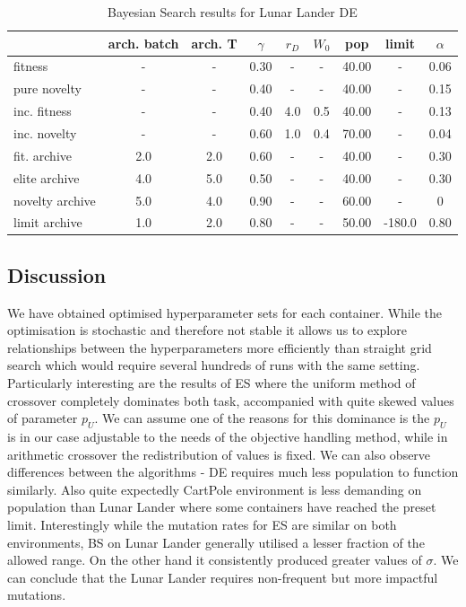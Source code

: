\begin{table}[ht]
	\centering
	\scriptsize
	\setlength{\tabcolsep}{4pt}
	\renewcommand{\arraystretch}{1.15}
	\begin{tabular}{lcccccccc}
		\toprule
		{} & arch. batch & arch. T &   $\gamma$ & $r_D$ & $W_0$ & pop &  limit &   $\alpha$ \\
		\midrule
		fitness         &           - &       - & 0.30 &     - &     - & 40.00 &      - & 0.06 \\
		pure novelty    &           - &       - & 0.40 &     - &     - & 40.00 &      - & 0.15 \\
		inc. fitness    &           - &       - & 0.40 &   4.0 &   0.5 & 40.00 &      - & 0.13 \\
		inc. novelty    &           - &       - & 0.60 &   1.0 &   0.4 & 70.00 &      - & 0.04 \\
		fit. archive    &         2.0 &     2.0 & 0.60 &     - &     - & 40.00 &      - & 0.30 \\
		elite archive   &         4.0 &     5.0 & 0.50 &     - &     - & 40.00 &      - & 0.30 \\
		novelty archive &         5.0 &     4.0 & 0.90 &     - &     - & 60.00 &      - &    0 \\
		limit archive   &         1.0 &     2.0 & 0.80 &     - &     - & 50.00 & -180.0 & 0.80 \\
		\bottomrule
	\end{tabular}
	
	\caption{Bayesian Search results for Lunar Lander DE}
		\label{tab:optunaRes4}
\end{table}
\subsection{Discussion}
We have obtained optimised hyperparameter sets for each container. While the optimisation is stochastic and therefore not stable it allows us to explore relationships between the hyperparameters more efficiently than straight grid search which would require several hundreds of runs with the same setting. 
Particularly interesting are the results of ES where the uniform method of crossover completely dominates both task, accompanied with quite skewed values of parameter $p_U$. We can assume one of the reasons for this dominance is the $p_U$ is in our case adjustable to the needs of the objective handling method, while in arithmetic crossover the  redistribution of values is fixed. 
We can also observe differences between the algorithms - DE requires much less population to function similarly. Also quite expectedly CartPole environment is less demanding on population than Lunar Lander where some containers have reached the preset limit. Interestingly while the mutation rates for ES are similar on both environments, BS on Lunar Lander generally utilised a lesser fraction of the allowed range. On the other hand it consistently produced greater values of $\sigma$. We can conclude that the Lunar Lander requires non-frequent but more impactful mutations.
\newpage
